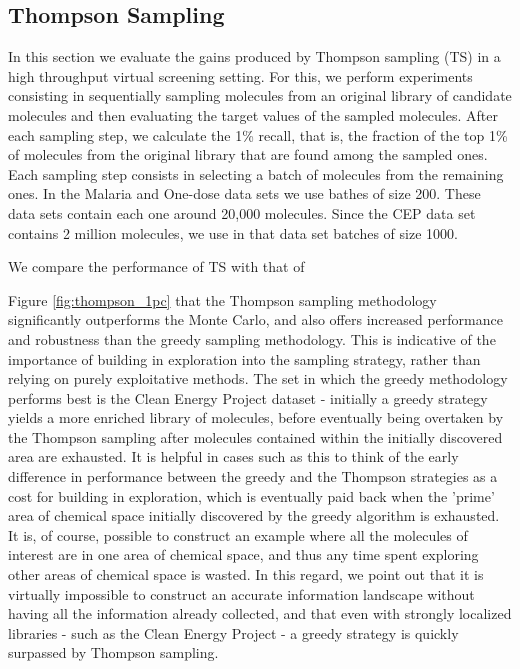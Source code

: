 \subsection{Thompson Sampling}

In this section we evaluate the gains produced by Thompson sampling (TS) in a high throughput virtual screening setting. For this, we perform experiments consisting in sequentially sampling molecules from an original library of candidate molecules and then evaluating the target values of the sampled molecules. After each sampling step, we calculate the 1\% recall, that is, the fraction of the top 1\% of molecules from the original library that are found among the sampled ones. Each sampling step consists in selecting a batch of molecules from the remaining ones. In the Malaria and One-dose data sets we use bathes of size 200. These data sets contain each one around 20,000 molecules. Since the CEP data set contains 2 million molecules, we use in that data set batches of size 1000.

We compare the performance of TS with that of 

Figure \ref{fig:thompson_1pc} that the Thompson sampling methodology significantly outperforms the Monte Carlo, and also offers increased performance and robustness than the greedy sampling methodology.  This is indicative of the importance of building in exploration into the sampling strategy, rather than relying on purely exploitative methods.  The set in which the greedy methodology performs best is the Clean Energy Project dataset - initially a greedy strategy yields a more enriched library of molecules, before eventually being overtaken by the Thompson sampling after molecules contained within the initially discovered area are exhausted.  It is helpful in cases such as this to think of the early difference in performance between the greedy and the Thompson strategies as a cost for building in exploration, which is eventually paid back when the 'prime' area of chemical space initially discovered by the greedy algorithm is exhausted.  It is, of course, possible to construct an example where all the molecules of interest are in one area of chemical space, and thus any time spent exploring other areas of chemical space is wasted.  In this regard, we point out that it is virtually impossible to construct an accurate information landscape without having all the information already collected, and that even with strongly localized libraries - such as the Clean Energy Project - a greedy strategy is quickly surpassed by Thompson sampling. 
  
